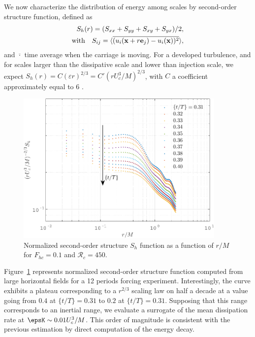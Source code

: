 \noindent We now characterize the distribution of energy among scales by second-order
structure function, defined as
\begin{eqnarray}
S_h(r) = (S_{xx} + S_{yy} + S_{xy} + S_{yx})/2,\\
\text{with} \quad S_{ij} = \langle\overline{(u_i({\bf x}+r{\bf e}_j)-u_i({\bf x}))^2}\rangle,
\end{eqnarray}
and $\overline{\cdot}$ time average when the carriage is moving. For a
developed turbulence, and for scales larger than the dissipative scale and
lower than injection scale, we expect
$S_h(r) = C (\varepsilon r)^{2/3} = C' (rU_c^3/M)^{2/3}$, with $C$ a coefficient
approximately equal to 6 \cite[see figure 15 in][]{AugierBillantChomaz2015}.
\begin{figure}[htb]
\centerline{
\includegraphics[height=7.5cm]{paper_05_milestone_issf/Figures/exp28/normalized_S2_exp28.pdf}}
\vspace{-2mm}
\caption{Normalized second-order structure $S_h$ function as a function of
$r/M$ for $F_{hc} = 0.1$ and $\mathcal{R}_c=450$.}
\label{fig:S2}
\end{figure}
Figure~\ref{fig:S2} represents normalized second-order structure function
computed from large horizontal fields for a 12 periods forcing
experiment. Interestingly, the curve exhibits a plateau corresponding to a
$r^{2/3}$ scaling law on half a decade at a value going from $0.4$ at
$\{t/T\} = 0.31$ to $0.2$ at $\{t/T\} = 0.31$. Supposing that this range
corresponds to an inertial range, we evaluate a surrogate of the mean
dissipation rate at $\epsK \sim 0.01 U_c^3/M$. This order of magnitude is
consistent with the previous estimation by direct computation of the energy
decay.

